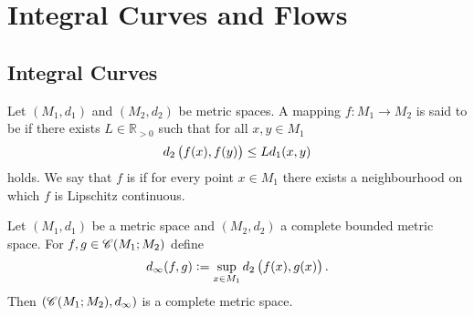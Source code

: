 \chapter{Integral Curves and Flows}
\section{Integral Curves}
\begin{definition}
Let $(M_1,d_1)$ and $(M_2,d_2)$ be metric spaces. A mapping $f: M_1 \to M_2$ is said to be  if there exists $L \in \mathbb{R}_{>0}$ such that for all $x,y \in M_1$
\begin{equation}
d_2\del[1]{f(x),f(y)} \leq L d_1(x,y)
\end{equation}
\noindent holds. We say that $f$ is  if for every point $x \in M_1$ there exists a neighbourhood on which $f$ is Lipschitz continuous.
\end{definition}

\begin{proposition}
Let $(M_1,d_1)$ be a metric space and $(M_2,d_2)$ a complete bounded metric space. For $f,g \in \mathscr{C}(M_1;M_2)$ define
\begin{equation}
d_\infty(f,g) := \sup_{x \in M_1} d_2\del[1]{f(x),g(x)}.
\end{equation}
Then $(\mathscr{C}(M_1;M_2),d_\infty)$ is a complete metric space.
\label{prop:complete}
\end{proposition}

